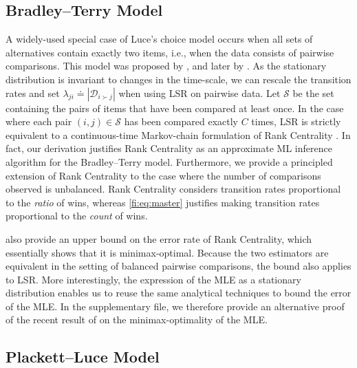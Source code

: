 \subsection{Bradley--Terry Model}
\label{fi:sec:pairwise}

A widely-used special case of Luce's choice model occurs when all sets of alternatives contain exactly two items, i.e., when the data consists of pairwise comparisons.
This model was proposed by \citet{zermelo1928berechnung}, and later by \citet{bradley1952rank}.
As the stationary distribution is invariant to changes in the time-scale, we can rescale the transition rates and set $\lambda_{ji} \doteq |\mathcal{D}_{i \succ j}|$ when using LSR on pairwise data.
Let $\mathcal{S}$ be the set containing the pairs of items that have been compared at least once.
In the case where each pair $(i, j) \in \mathcal{S}$ has been compared exactly $C$ times, LSR is strictly equivalent to a continuous-time Markov-chain formulation of Rank Centrality \citep{negahban2012iterative}.
In fact, our derivation justifies Rank Centrality as an approximate ML inference algorithm for the Bradley--Terry model.
Furthermore, we provide a principled extension of Rank Centrality to the case where the number of comparisons observed is unbalanced.
Rank Centrality considers transition rates proportional to the \emph{ratio} of wins, whereas \eqref{fi:eq:master} justifies making transition rates proportional to the \emph{count} of wins.

\citet{negahban2012iterative} also provide an upper bound on the error rate of Rank Centrality, which essentially shows that it is minimax-optimal.
Because the two estimators are equivalent in the setting of balanced pairwise comparisons, the bound also applies to LSR.
More interestingly, the expression of the MLE as a stationary distribution enables us to reuse the same analytical techniques to bound the error of the MLE.
In the supplementary file, we therefore provide an alternative proof of the recent result of \citet{hajek2014minimax} on the minimax-optimality of the MLE. %

\subsection{Plackett--Luce Model}
\label{fi:sec:partial}

